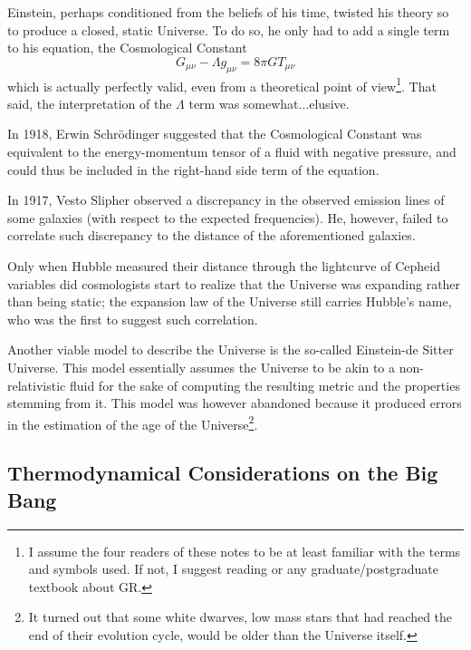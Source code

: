 \par Einstein, perhaps conditioned from the beliefs of his time, twisted his theory so to produce a closed, static Universe. To do so, he only had to add a single term to his equation, the Cosmological Constant
\begin{equation}
    G_{\mu\nu} - \Lambda g_{\mu\nu} = 8\pi G T_{\mu\nu}
    \label{eq:modified_einsteineq}
\end{equation}
which is actually perfectly valid, even from a theoretical point of view\footnote{I assume the four readers of these notes to be at least familiar with the terms and symbols used. If not, I suggest reading \cite{carroll} or any graduate/postgraduate textbook about GR.}. That said, the interpretation of the $\Lambda$ term was somewhat...elusive.
\par In 1918, Erwin Schrödinger suggested that the Cosmological Constant was equivalent to the energy-momentum tensor of a fluid with negative pressure, and could thus be included in the right-hand side term of the equation.
\par In 1917, Vesto Slipher observed a discrepancy in the observed emission lines of some galaxies (with respect to the expected frequencies). He, however, failed to correlate such discrepancy to the distance of the aforementioned galaxies.
\par Only when Hubble measured their distance \cite{1926CMWCI.324....1H} through the lightcurve of Cepheid variables did cosmologists start to realize that the Universe was expanding rather than being static; the expansion law of the Universe still carries Hubble's name, who was the first to suggest such correlation.
\par Another viable model to describe the Universe is the so-called Einstein-de Sitter Universe. This model essentially assumes the Universe to be akin to a non-relativistic fluid for the sake of computing the resulting metric and the properties stemming from it. This model was however abandoned because it produced errors in the estimation of the age of the Universe\footnote{It turned out that some white dwarves, low mass stars that had reached the end of their evolution cycle, would be older than the Universe itself.}.

\subsection*{Thermodynamical Considerations on the Big Bang}

